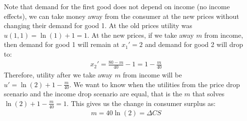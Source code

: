 \documentclass{article}
\begin{document}
\begin{itemize}
    Note that demand for the first good does not depend on income (no income effects), we can take money away from the consumer at the new prices without changing their demand for good 1. At the old prices utility was $u(1,1) = \ln(1) + 1 = 1$. At the new prices, if we take away $m$ from income, then demand for good 1 will remain at $x_{1}' = 2$ and demand for good 2 will drop to:
    \begin{gather*}
      x_{2}' = \frac{80 - m}{40} - 1 = 1 - \frac{m}{40}
    \end{gather*}
    Therefore, utility after we take away $m$ from income will be $u' = \ln(2) + 1 - \tfrac{m}{40}$. We want to know when the utilities from the price drop scenario and the income drop scenario are equal, that is the $m$ that solves $\ln(2) + 1 - \tfrac{m}{40} = 1$. This gives us the change in consumer surplus as:
    \begin{gather*}
      m = 40 \ln(2) = \Delta CS
    \end{gather*}
  \end{itemize}
  \par
\vspace{6mm}
\end{document}
